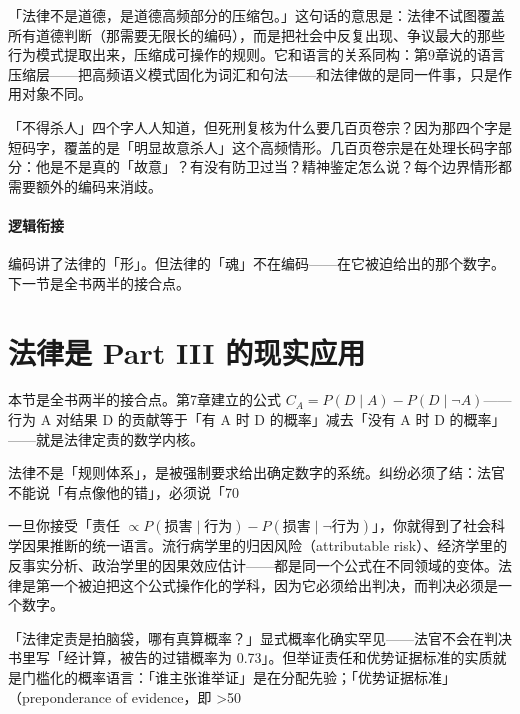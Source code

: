 \documentclass[../../main2.tex]{subfiles}
\begin{document}
	「法律不是道德，是道德高频部分的压缩包。」这句话的意思是：法律不试图覆盖所有道德判断（那需要无限长的编码），而是把社会中反复出现、争议最大的那些行为模式提取出来，压缩成可操作的规则。它和语言的关系同构：第9章说的语言压缩层——把高频语义模式固化为词汇和句法——和法律做的是同一件事，只是作用对象不同。

	\begin{readingnote}
		「不得杀人」四个字人人知道，但死刑复核为什么要几百页卷宗？因为那四个字是短码字，覆盖的是「明显故意杀人」这个高频情形。几百页卷宗是在处理长码字部分：他是不是真的「故意」？有没有防卫过当？精神鉴定怎么说？每个边界情形都需要额外的编码来消歧。
	\end{readingnote}

	\paragraph*{逻辑衔接}
	编码讲了法律的「形」。但法律的「魂」不在编码——在它被迫给出的那个数字。下一节是全书两半的接合点。
	\section{法律是 Part III 的现实应用}
	\label{sec:law-quantitative}
	本节是全书两半的接合点。第7章建立的公式 $C_A = P(D \mid A) - P(D \mid \neg A)$——行为 A 对结果 D 的贡献等于「有 A 时 D 的概率」减去「没有 A 时 D 的概率」——就是法律定责的数学内核。

	法律不是「规则体系」，是被强制要求给出确定数字的系统。纠纷必须了结：法官不能说「有点像他的错」，必须说「70%

	一旦你接受「责任 $\propto P(\text{损害} \mid \text{行为}) - P(\text{损害} \mid \neg \text{行为})$」，你就得到了社会科学因果推断的统一语言。流行病学里的归因风险（attributable risk）、经济学里的反事实分析、政治学里的因果效应估计——都是同一个公式在不同领域的变体。法律是第一个被迫把这个公式操作化的学科，因为它必须给出判决，而判决必须是一个数字。

	\begin{questionbox}
		「法律定责是拍脑袋，哪有真算概率？」显式概率化确实罕见——法官不会在判决书里写「经计算，被告的过错概率为 0.73」。但举证责任和优势证据标准的实质就是门槛化的概率语言：「谁主张谁举证」是在分配先验；「优势证据标准」（preponderance of evidence，即 >50%
	\end{questionbox}
\end{document}
